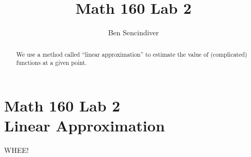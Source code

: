 \documentclass{ximera}
\title{Math 160 Lab 2}
\author{Ben Sencindiver}
\begin{document}
\begin{abstract}
We use a method called ``linear approximation'' to estimate the value
of (complicated) functions at a given point.
\end{abstract}

\maketitle

\section{Math 160 Lab 2 \\ Linear Approximation}

WHEE!
\end{document}
